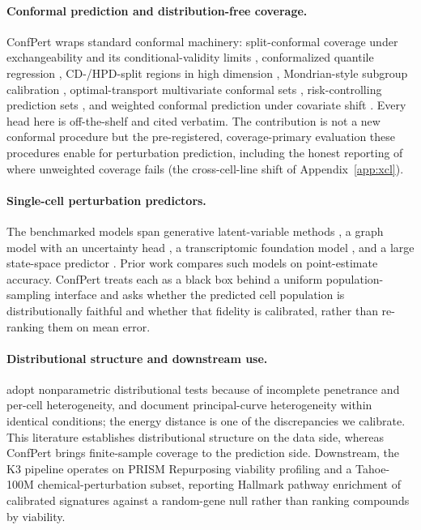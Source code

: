 \documentclass{article}
\begin{document}
\paragraph{Conformal prediction and distribution-free coverage.}
ConfPert wraps standard conformal machinery: split-conformal coverage under exchangeability and its conditional-validity limits \citep{vovk2012}, conformalized quantile regression \citep{romano2019}, CD-/HPD-split regions in high dimension \citep{izbicki2022}, Mondrian-style subgroup calibration \citep{cauchois2021}, optimal-transport multivariate conformal sets \citep{otcp2025}, risk-controlling prediction sets \citep{bates2021}, and weighted conformal prediction under covariate shift \citep{tibshirani2019}. Every head here is off-the-shelf and cited verbatim. The contribution is not a new conformal procedure but the pre-registered, coverage-primary evaluation these procedures enable for perturbation prediction, including the honest reporting of where unweighted coverage fails (the cross-cell-line shift of Appendix~\ref{app:xcl}).

\paragraph{Single-cell perturbation predictors.}
The benchmarked models span generative latent-variable methods \citep{lotfollahi2019scgen, lotfollahi2023cpa, piran2024biolord, bereket2023}, a graph model with an uncertainty head \citep{roohani2024gears}, a transcriptomic foundation model \citep{cui2024scgpt}, and a large state-space predictor \citep{adduri2025state}. Prior work compares such models on point-estimate accuracy. ConfPert treats each as a black box behind a uniform population-sampling interface and asks whether the predicted cell population is distributionally faithful and whether that fidelity is calibrated, rather than re-ranking them on mean error.

\paragraph{Distributional structure and downstream use.}
\citet{replogle2022} adopt nonparametric distributional tests because of incomplete penetrance and per-cell heterogeneity, and \citet{norman2019} document principal-curve heterogeneity within identical conditions; the energy distance \citep{szekely2013} is one of the discrepancies we calibrate. This literature establishes distributional structure on the data side, whereas ConfPert brings finite-sample coverage to the prediction side. Downstream, the K3 pipeline operates on PRISM Repurposing viability profiling \citep{corsello2020prism} and a Tahoe-100M \citep{tahoe2025} chemical-perturbation subset, reporting Hallmark pathway enrichment of calibrated signatures against a random-gene null rather than ranking compounds by viability.
\end{document}
